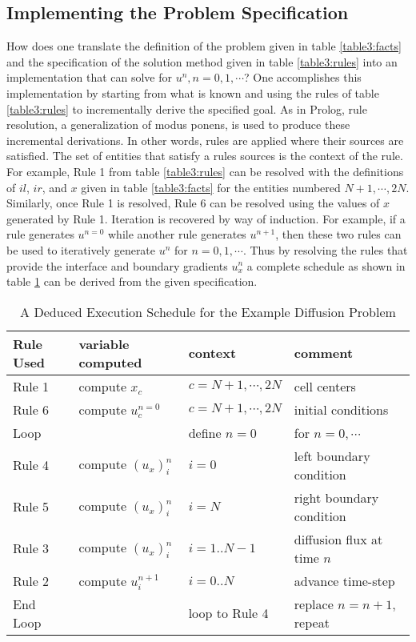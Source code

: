 \subsection{Implementing the  Problem Specification}

How does one translate the definition of the problem given in table
\ref{table3:facts} and the specification of the solution method given
in table \ref{table3:rules} into an implementation that can solve for
$u^n, n=0,1, \cdots$?  One accomplishes this implementation by
starting from what is known and using the rules of table
\ref{table3:rules} to incrementally derive the specified goal.  As in
Prolog\cite{Clocksin.87}\cite{Sterling.86}, rule resolution, a
generalization of modus ponens, is used to produce these incremental
derivations.  In other words, rules are applied where their sources
are satisfied.  The set of entities that satisfy a rules sources is
the context of the rule.  For example, Rule 1 from table
\ref{table3:rules} can be resolved with the definitions of $il$, $ir$,
and $x$ given in table \ref{table3:facts} for the entities numbered
$N+1, \cdots, 2N$.  Similarly, once Rule 1 is resolved, Rule 6 can be
resolved using the values of $x$ generated by Rule 1.  Iteration is
recovered by way of induction.  For example, if a rule generates
$u^{n=0}$ while another rule generates $u^{n+1}$, then these two rules
can be used to iteratively generate $u^n$ for $n=0,1, \cdots$.  Thus
by resolving the rules that provide the interface and boundary
gradients $u_x^n$ a complete schedule as shown in table
\ref{table3:schedule} can be derived from the given specification.

\begin{table}[htbp]
\caption{ A Deduced Execution Schedule for the Example
  Diffusion Problem}
\begin{center}
  \begin{tabular}{|l|l|l|l|}
    \hline
    Rule Used & variable computed  & context          & comment \\
    \hline
    Rule 1 & compute $x_c$         & $c=N+1, \cdots, 2N$ & cell centers\\
    Rule 6 & compute $u^{n=0}_c$   & $c=N+1, \cdots, 2N$ & initial conditions \\
    Loop   &                       & define $n=0$     & for $n=0,\cdots$ \\
    Rule 4 & compute $(u_x)^n_i$   & $i=0$       & left boundary condition\\
    Rule 5 & compute $(u_x)^n_i$   & $i=N$       & right boundary condition\\
    Rule 3 & compute $(u_x)^n_i$   & $i=1..N-1$  & diffusion flux at time $n$\\
    Rule 2 & compute $u^{n+1}_i$   & $i=0..N$    & advance time-step\\
    End Loop &                     & loop to Rule 4 & replace $n=n+1$, repeat\\
    \hline
  \end{tabular}
\end{center}
\label{table3:schedule}
\end{table}

